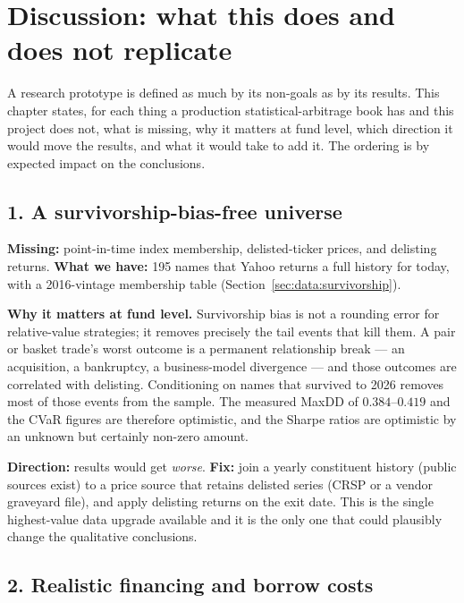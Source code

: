 \section{Discussion: what this does and does not replicate}
\label{ch:nongoals}

A research prototype is defined as much by its non-goals as by its results. This chapter
states, for each thing a production statistical-arbitrage book has and this project does
not, what is missing, why it matters at fund level, which direction it would move the
results, and what it would take to add it. The ordering is by expected impact on the
conclusions.

\subsection{1. A survivorship-bias-free universe}

\textbf{Missing:} point-in-time index membership, delisted-ticker prices, and delisting
returns. \textbf{What we have:} 195 names that Yahoo returns a full history for today, with
a 2016-vintage membership table (Section~\ref{sec:data:survivorship}).

\textbf{Why it matters at fund level.} Survivorship bias is not a rounding error for
relative-value strategies; it removes precisely the tail events that kill them. A pair or
basket trade's worst outcome is a permanent relationship break --- an acquisition, a
bankruptcy, a business-model divergence --- and those outcomes are correlated with
delisting. Conditioning on names that survived to 2026 removes most of those events from
the sample. The measured MaxDD of $0.384$--$0.419$ and the CVaR figures are therefore
optimistic, and the Sharpe ratios are optimistic by an unknown but certainly non-zero
amount.

\textbf{Direction:} results would get \emph{worse}. \textbf{Fix:} join a yearly constituent
history (public sources exist) to a price source that retains delisted series (CRSP or a
vendor graveyard file), and apply delisting returns on the exit date. This is the single
highest-value data upgrade available and it is the only one that could plausibly change the
qualitative conclusions.

\subsection{2. Realistic financing and borrow costs}

